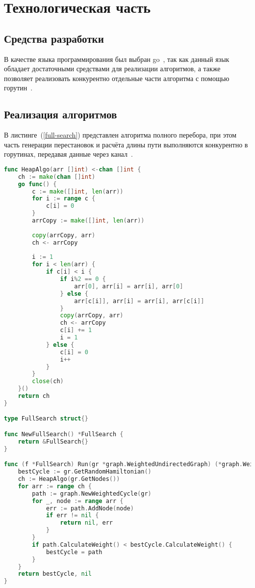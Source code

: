 \chapter{Технологическая часть}
\section{Средства разработки}

В качестве языка программирования был выбран go~\cite{go}, так как данный язык обладает достаточными средствами для реализации алгоритмов, а также позволяет реализовать конкурентно отдельные части алгоритма с помощью горутин~\cite{go-mem}.

\section{Реализация алгоритмов}

В листинге~(\ref{full-search}) представлен алгоритма полного перебора, при этом часть генерации перестановок и расчёта длины пути выполняются конкурентно в горутинах, передавая данные через канал~\cite{go-mem}.

\begin{lstlisting}[label=full-search,caption={Алгоритм полного перебора},language=go]
func HeapAlgo(arr []int) <-chan []int {
	ch := make(chan []int)
	go func() {
		c := make([]int, len(arr))
		for i := range c {
			c[i] = 0
		}
		arrCopy := make([]int, len(arr))
		
		copy(arrCopy, arr)
		ch <- arrCopy
		
		i := 1
		for i < len(arr) {
			if c[i] < i {
				if i%2 == 0 {
					arr[0], arr[i] = arr[i], arr[0]
				} else {
					arr[c[i]], arr[i] = arr[i], arr[c[i]]
				}
				copy(arrCopy, arr)
				ch <- arrCopy
				c[i] += 1
				i = 1
			} else {
				c[i] = 0
				i++
			}
		}
		close(ch)
	}()
	return ch
}

type FullSearch struct{}

func NewFullSearch() *FullSearch {
	return &FullSearch{}
}

func (f *FullSearch) Run(gr *graph.WeightedUndirectedGraph) (*graph.WeightedCycle, error) {
	bestCycle := gr.GetRandomHamiltonian()
	ch := HeapAlgo(gr.GetNodes())
	for arr := range ch {
		path := graph.NewWeightedCycle(gr)
		for _, node := range arr {
			err := path.AddNode(node)
			if err != nil {
				return nil, err
			}
		}
		if path.CalculateWeight() < bestCycle.CalculateWeight() {
			bestCycle = path
		}
	}
	return bestCycle, nil
}
\end{lstlisting}

